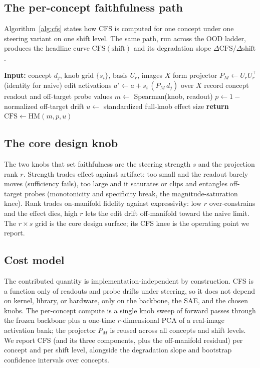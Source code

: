 \documentclass[conference]{IEEEtran}
\begin{document}
\subsection{The per-concept faithfulness path}
Algorithm~\ref{alg:cfs} states how CFS is computed for one concept under one steering variant on one shift level. The same path, run across the OOD ladder, produces the headline curve $\mathrm{CFS}(\text{shift})$ and its degradation slope $\Delta\mathrm{CFS}/\Delta\text{shift}$.

\begin{algorithm}[t]
\caption{CFS of a steering variant for concept $j$}
\label{alg:cfs}
\begin{algorithmic}
\STATE \textbf{Input:} concept $d_j$, knob grid $\{s_i\}$, basis $U_r$, images $X$
\STATE form projector $P_M \leftarrow U_r U_r^{\top}$ (identity for naive)
  \STATE edit activations $a' \leftarrow a + s_i\,(P_M\,d_j)$ over $X$
  \STATE record concept readout and off-target probe values
\ENDFOR
\STATE $m \leftarrow$ Spearman(knob, readout) 
\STATE $p \leftarrow 1 - $ normalized off-target drift 
\STATE $u \leftarrow$ standardized full-knob effect size 
\STATE \textbf{return} $\mathrm{CFS} \leftarrow \mathrm{HM}(m, p, u)$
\end{algorithmic}
\end{algorithm}

\subsection{The core design knob}
The two knobs that set faithfulness are the steering strength $s$ and the projection rank $r$. Strength trades effect against artifact: too small and the readout barely moves (sufficiency fails), too large and it saturates or clips and entangles off-target probes (monotonicity and specificity break, the magnitude-saturation knee). Rank trades on-manifold fidelity against expressivity: low $r$ over-constrains and the effect dies, high $r$ lets the edit drift off-manifold toward the naive limit. The $r \times s$ grid is the core design surface; its CFS knee is the operating point we report.

\subsection{Cost model}
The contributed quantity is implementation-independent by construction. CFS is a function only of readouts and probe drifts under steering, so it does not depend on kernel, library, or hardware, only on the backbone, the SAE, and the chosen knobs. The per-concept compute is a single knob sweep of forward passes through the frozen backbone plus a one-time $r$-dimensional PCA of a real-image activation bank; the projector $P_M$ is reused across all concepts and shift levels. We report CFS (and its three components, plus the off-manifold residual) per concept and per shift level, alongside the degradation slope and bootstrap confidence intervals over concepts.
\end{document}
